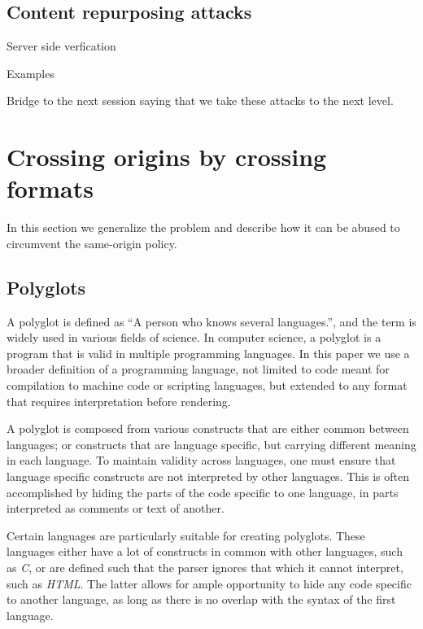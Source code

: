 \documentclass[10pt, conference, compsocconf]{IEEEtran}
\begin{document}
\subsection{Content repurposing attacks}

Server side verfication

Examples


Bridge to the next session saying that we take these attacks to the
next level.

\section{Crossing origins by crossing formats}


In this section we generalize the problem and describe 
how it can be abused to circumvent the same-origin policy.


\subsection{Polyglots}


A polyglot is defined as ``A person who knows several languages.'', 
and the term is widely used in various fields of science. In computer 
science, a polyglot is a program that is valid in multiple programming 
languages. In this paper we use a broader definition of a programming language, 
not limited to code meant for compilation to machine code or scripting 
languages, but extended to any format that requires interpretation 
before rendering.

A polyglot is composed from various constructs that are either 
common between languages; or constructs that are language specific, but carrying 
different meaning in each language. To maintain validity across languages, 
one must ensure that language specific constructs are not interpreted by 
other languages. This is often accomplished by hiding the parts of the 
code specific to one language, in parts interpreted as comments or text 
of another.

Certain languages are particularly suitable for creating polyglots. 
These languages either have a lot of constructs in common with other 
languages, such as \emph{C}, or are defined such that the parser 
ignores that which it cannot interpret, such as \emph{HTML}. The 
latter allows for ample opportunity to hide any code specific to 
another language, as long as there is no overlap with the syntax 
of the first language.
\end{document}
